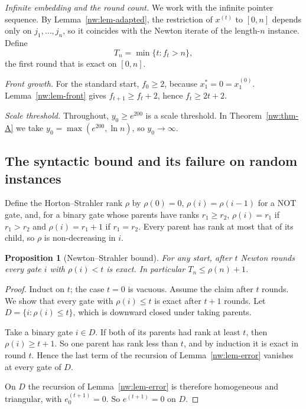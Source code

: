 \documentclass[11pt]{amsart}
\newtheorem{proposition}[theorem]{Proposition}
\theoremstyle{definition}
\theoremstyle{remark}
\begin{document}
\emph{Infinite embedding and the round count.} We work with the infinite
pointer sequence. By Lemma~\ref{nw:lem-adapted}, the restriction of
$x^{(t)}$ to $[0,n]$ depends only on $j_1,\dots,j_n$, so it coincides with the
Newton iterate of the length-$n$ instance. Define
\[
  T_n=\min\{t:f_t>n\},
\]
the first round that is exact on $[0,n]$.

\emph{Front growth.} For the standard start, $f_0\ge2$, because
$x^*_1=0=x^{(0)}_1$. Lemma~\ref{nw:lem-front} gives $f_{t+1}\ge f_t+2$, hence
$f_t\ge 2t+2$.

\emph{Scale threshold.} Throughout, $y_0\ge e^{200}$ is a scale threshold. In
Theorem~\ref{nw:thm-A} we take $y_0=\max(e^{200},\ln n)$, so $y_0\to\infty$.

\subsection{The syntactic bound and its failure on random instances}
\label{nw:sec-strahler}

Define the Horton--Strahler rank $\rho$ by $\rho(0)=0$, $\rho(i)=\rho(i-1)$
for a NOT gate, and, for a binary gate whose parents have ranks
$r_1\ge r_2$, $\rho(i)=r_1$ if $r_1>r_2$ and $\rho(i)=r_1+1$ if $r_1=r_2$.
Every parent has rank at most that of its child, so $\rho$ is non-decreasing
in $i$.

\begin{proposition}[Newton--Strahler bound]\label{nw:prop-strahler-bound}
For any start, after $t$ Newton rounds every gate $i$ with $\rho(i)<t$ is
exact. In particular $T_n\le\rho(n)+1$.
\end{proposition}

\begin{proof}
Induct on $t$; the case $t=0$ is vacuous. Assume the claim after $t$ rounds.
We show that every gate with $\rho(i)\le t$ is exact after $t+1$ rounds. Let
$D=\{i:\rho(i)\le t\}$, which is downward closed under taking parents.

Take a binary gate $i\in D$. If both of its parents had rank at least $t$,
then $\rho(i)\ge t+1$. So one parent has rank less than $t$, and by induction
it is exact in round $t$. Hence the last term of the recursion of
Lemma~\ref{nw:lem-error} vanishes at every gate of $D$.

On $D$ the recursion of Lemma~\ref{nw:lem-error} is therefore homogeneous
and triangular, with $e^{(t+1)}_0=0$. So $e^{(t+1)}=0$ on $D$.
\end{proof}
\end{document}
